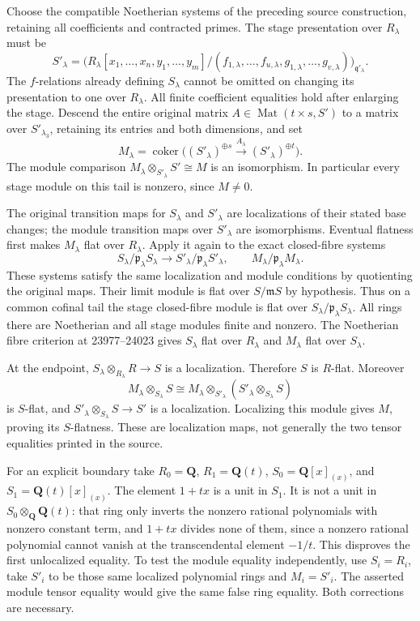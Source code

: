 Choose the compatible Noetherian systems of the preceding source construction, retaining all coefficients and contracted primes. The stage presentation over \(R_\lambda\) must be \[
S'_\lambda=
\bigl(R_\lambda[x_1,\ldots,x_n,y_1,\ldots,y_m]/
 (f_{1,\lambda},\ldots,f_{u,\lambda},
  g_{1,\lambda},\ldots,g_{v,\lambda})\bigr)_{\mathfrak q'_\lambda}.
\] The \(f\)-relations already defining \(S_\lambda\) cannot be omitted on changing its presentation to one over \(R_\lambda\). All finite coefficient equalities hold after enlarging the stage. Descend the entire original matrix \(A\in\operatorname{Mat}(t\times s,S')\) to a matrix over \(S'_{\lambda_3}\), retaining its entries and both dimensions, and set \[
M_\lambda=\operatorname{coker}\bigl((S'_\lambda)^{\oplus s}
 \xrightarrow{A_\lambda}(S'_\lambda)^{\oplus t}\bigr).
\] The module comparison \(M_\lambda\otimes_{S'_\lambda}S'\cong M\) is an isomorphism. In particular every stage module on this tail is nonzero, since \(M\ne0\).

The original transition maps for \(S_\lambda\) and \(S'_\lambda\) are localizations of their stated base changes; the module transition maps over \(S'_\lambda\) are isomorphisms. Eventual flatness first makes \(M_\lambda\) flat over \(R_\lambda\). Apply it again to the exact closed-fibre systems \[
S_\lambda/\mathfrak p_\lambda S_\lambda
\longrightarrow S'_\lambda/\mathfrak p_\lambda S'_\lambda,\qquad
M_\lambda/\mathfrak p_\lambda M_\lambda.
\] These systems satisfy the same localization and module conditions by quotienting the original maps. Their limit module is flat over \(S/\mathfrak mS\) by hypothesis. Thus on a common cofinal tail the stage closed-fibre module is flat over \(S_\lambda/\mathfrak p_\lambda S_\lambda\). All rings there are Noetherian and all stage modules finite and nonzero. The Noetherian fibre criterion at 23977--24023 gives \(S_\lambda\) flat over \(R_\lambda\) and \(M_\lambda\) flat over \(S_\lambda\).

At the endpoint, \(S_\lambda\otimes_{R_\lambda}R\to S\) is a localization. Therefore \(S\) is \(R\)-flat. Moreover \[
M_\lambda\otimes_{S_\lambda}S
 \cong M_\lambda\otimes_{S'_\lambda}(S'_\lambda\otimes_{S_\lambda}S)
\] is \(S\)-flat, and \(S'_\lambda\otimes_{S_\lambda}S\to S'\) is a localization. Localizing this module gives \(M\), proving its \(S\)-flatness. These are localization maps, not generally the two tensor equalities printed in the source.

For an explicit boundary take \(R_0=\mathbf Q\), \(R_1=\mathbf Q(t)\), \(S_0=\mathbf Q[x]_{(x)}\), and \(S_1=\mathbf Q(t)[x]_{(x)}\). The element \(1+tx\) is a unit in \(S_1\). It is not a unit in \(S_0\otimes_{\mathbf Q}\mathbf Q(t)\): that ring only inverts the nonzero rational polynomials with nonzero constant term, and \(1+tx\) divides none of them, since a nonzero rational polynomial cannot vanish at the transcendental element \(-1/t\). This disproves the first unlocalized equality. To test the module equality independently, use \(S_i=R_i\), take \(S'_i\) to be those same localized polynomial rings and \(M_i=S'_i\). The asserted module tensor equality would give the same false ring equality. Both corrections are necessary.

